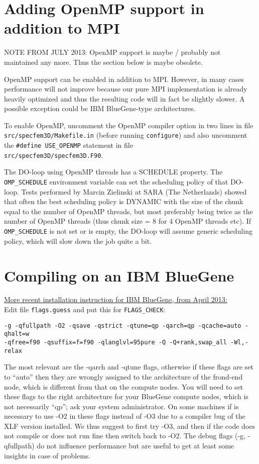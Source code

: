 \section{Adding OpenMP support in addition to MPI}

NOTE FROM JULY 2013: OpenMP support is maybe / probably not maintained any more.
Thus the section below is maybe obsolete.

OpenMP support can be enabled in addition to MPI. However, in many
cases performance will not improve because our pure MPI implementation
is already heavily optimized and thus the resulting code will in fact
be slightly slower. A possible exception could be IBM BlueGene-type
architectures.

To enable OpenMP, uncomment the OpenMP compiler option in two lines
in file \texttt{src/specfem3D/Makefile.in} (before running \texttt{configure})
and also uncomment the
\texttt{\#define USE\_OPENMP} statement in file\\
\texttt{src/specfem3D/specfem3D.F90}.

The DO-loop using OpenMP threads has a SCHEDULE property. The \texttt{OMP\_SCHEDULE}
environment variable can set the scheduling policy of that DO-loop.
Tests performed by Marcin Zielinski at SARA (The Netherlands) showed
that often the best scheduling policy is DYNAMIC with the size of
the chunk equal to the number of OpenMP threads, but most preferably
being twice as the number of OpenMP threads (thus chunk size = 8 for
4 OpenMP threads etc). If \texttt{OMP\_SCHEDULE} is not set or is empty, the
DO-loop will assume generic scheduling policy, which will slow down
the job quite a bit.


\section{Compiling on an IBM BlueGene}

\underline{More recent installation instruction for IBM BlueGene, from April 2013:}\\


\noindent Edit file \texttt{flags.guess} and put this for \texttt{FLAGS\_CHECK}:
\begin{verbatim}
-g -qfullpath -O2 -qsave -qstrict -qtune=qp -qarch=qp -qcache=auto -qhalt=w
-qfree=f90 -qsuffix=f=f90 -qlanglvl=95pure -Q -Q+rank,swap_all -Wl,-relax
\end{verbatim}

\noindent The most relevant are the -qarch and -qtune flags, otherwise
if these flags are set to ``auto'' then they are wrongly assigned
to the architecture of the frond-end node, which is different from
that on the compute nodes. You will need to set these flags to the
right architecture for your BlueGene compute nodes, which is not necessarily
``qp''; ask your system administrator. On some machines if is necessary
to use -O2 in these flags instead of -O3 due to a compiler bug of
the XLF version installed. We thus suggest to first try -O3, and then
if the code does not compile or does not run fine then switch back
to -O2. The debug flags (-g, -qfullpath) do not influence performance
but are useful to get at least some insights in case of problems.\\


